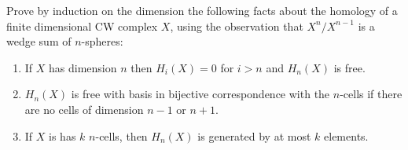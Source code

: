 \begin{problem}[Hatcher {\S}2.1, Ex.\@ 22]
Prove by induction on the dimension the following facts about the homology
of a finite dimensional CW complex $X$, using the observation that
$X^n/X^{n-1}$ is a wedge sum of $n$-spheres:
\begin{enumerate}[label=(\alph*)]
\item If $X$ has dimension $n$ then $H_i(X)=0$ for $i>n$ and $H_n(X)$ is
  free.
\item $H_n(X)$ is free with basis in bijective correspondence with the
  $n$-cells if there are no cells of dimension $n-1$ or $n+1$.
\item If $X$ is has $k$ $n$-cells, then $H_n(X)$ is generated by at most
  $k$ elements.
\end{enumerate}
\end{problem}
